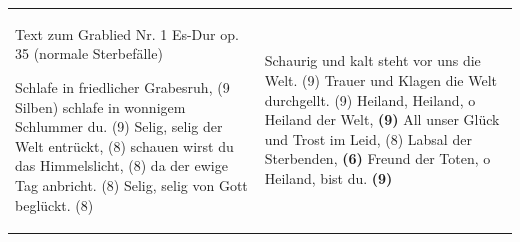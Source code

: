 \begin{flushleft}
\tablefirsthead{}
\tablehead{}
\tabletail{}
\tablelasttail{}
\begin{supertabular}{m{7.9230003cm}m{7.9230003cm}}
Text zum Grablied Nr. 1 Es-Dur op. 35 (normale Sterbefälle)

Schlafe in friedlicher Grabesruh, (9 Silben)\newline
schlafe in wonnigem Schlummer du. (9)\newline
Selig, selig der Welt entrückt, (8)\newline
schauen wirst du das Himmelslicht, (8)\newline
da der ewige Tag anbricht. (8)\newline
Selig, selig von Gott beglückt. (8) &
Schaurig und kalt steht vor uns die Welt. (9)\newline
Trauer und Klagen die Welt durchgellt. (9)\newline
Heiland, Heiland, o Heiland der Welt, \textbf{(9)}\newline
All unser Glück und Trost im Leid, (8)\newline
Labsal der Sterbenden, \textbf{(6)}\newline
Freund der Toten, o Heiland, bist du. \textbf{(9)}\\
\end{supertabular}
\end{flushleft}





